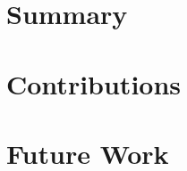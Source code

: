 \renewcommand{\labelenumii}{\arabic{enumi}.\arabic{enumii}}
\renewcommand{\labelenumiii}{\arabic{enumi}.\arabic{enumii}.\arabic{enumiii}}
\renewcommand{\labelenumiv}{\arabic{enumi}.\arabic{enumii}.\arabic{enumiii}.\arabic{enumiv}}

\label{chap:conclusion}

\section{Summary}
\section{Contributions}
\section{Future Work}
